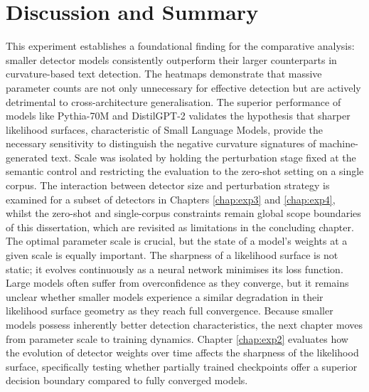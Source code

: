 \documentclass[logo,msc,cs]{infthesis}      %
\begin{document}
\section{Discussion and Summary}
\label{sec:exp1_summary}
This experiment establishes a foundational finding for the comparative analysis: smaller detector models consistently outperform their larger counterparts in curvature-based text detection. The heatmaps demonstrate that massive parameter counts are not only unnecessary for effective detection but are actively detrimental to cross-architecture generalisation. The superior performance of models like Pythia-70M and DistilGPT-2 validates the hypothesis that sharper likelihood surfaces, characteristic of Small Language Models, provide the necessary sensitivity to distinguish the negative curvature signatures of machine-generated text.
Scale was isolated by holding the perturbation stage fixed at the semantic control and restricting the evaluation to the zero-shot setting on a single corpus. The interaction between detector size and perturbation strategy is examined for a subset of detectors in Chapters \ref{chap:exp3} and \ref{chap:exp4}, whilst the zero-shot and single-corpus constraints remain global scope boundaries of this dissertation, which are revisited as limitations in the concluding chapter.
The optimal parameter scale is crucial, but the state of a model's weights at a given scale is equally important. The sharpness of a likelihood surface is not static; it evolves continuously as a neural network minimises its loss function. Large models often suffer from overconfidence as they converge, but it remains unclear whether smaller models experience a similar degradation in their likelihood surface geometry as they reach full convergence. Because smaller models possess inherently better detection characteristics, the next chapter moves from parameter scale to training dynamics. Chapter \ref{chap:exp2} evaluates how the evolution of detector weights over time affects the sharpness of the likelihood surface, specifically testing whether partially trained checkpoints offer a superior decision boundary compared to fully converged models.
\end{document}
